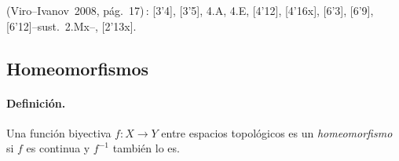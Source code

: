 (Viro--Ivanov~2008, pág.~17)\,: [3'4], [3'5], 4.A, 4.E, [4'12], [4'16x], [6'3], [6'9], [6'12]--sust.\ 2.Mx--, [2'13x].

\subsection{Homeomorfismos}

\paragraph{\textbf{Definición.}}
Una función biyectiva $f\colon X\to Y$ entre espacios topológicos es un \emph{homeomorfismo} si $f$ es continua y $f^{-1}$ también lo es.